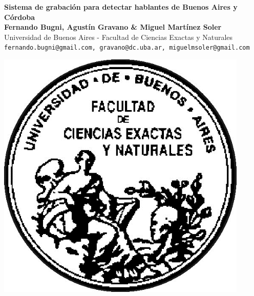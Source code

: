 \documentclass[a0,portrait]{a0poster}
\begin{document}


\begin{minipage}[b]{0.75\linewidth}
\veryHuge \color{NavyBlue} \textbf{Sistema de grabación para detectar hablantes de Buenos Aires y Córdoba} \color{Black}\\ %
\huge \textbf{Fernando Bugni, Agustín Gravano \& Miguel Martínez Soler}\\[0.5cm] %
\huge Universidad de Buenos Aires - Facultad de Ciencias Exactas y Naturales\\[0.4cm] %
\Large \texttt{fernando.bugni@gmail.com, gravano@dc.uba.ar, miguelmsoler@gmail.com} \\
\end{minipage}
%
\begin{minipage}[b]{0.25\linewidth}
\includegraphics[width=12cm]{logo-uba.png}\\
\end{minipage}
\end{document}
